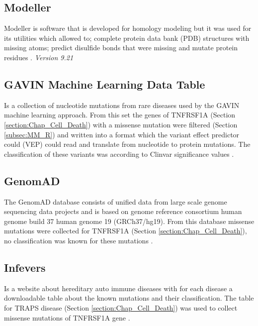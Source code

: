 \subsection{Modeller}
Modeller is software that is developed for homology modeling but it was used for its utilities which allowed to; complete protein data bank (PDB) structures with missing atoms; predict disulfide bonds that were missing and mutate protein residues \cite{}. 
\label{subsec:MM_Modeller}
\newline
\textit{Version 9.21}

\subsection{GAVIN Machine Learning Data Table}
Is a collection of nucleotide mutations from rare diseases used by the GAVIN \cite{} machine learning approach. From this set the genes of TNFRSF1A (Section \ref{section:Chap_Cell_Death}) with a missense mutation were filtered (Section \ref{subsec:MM_R}) and written into a format which the variant effect predictor could (VEP) \cite{} could read and translate from nucleotide to protein mutations. The classification of these variants was according to Clinvar significance values \cite{}. 
\label{subsec:MM_GAVIN_data_table}

\subsection{GenomAD}
The GenomAD database consists of unified data from large scale genome sequencing data projects and is based on genome reference consortium human genome build 37 human genome 19 (GRCh37/hg19). From this database missense mutations were collected for TNFRSF1A (Section \ref{section:Chap_Cell_Death}), no classification was known for these mutations \cite{}.
\label{subsec:MM_GenomAD}

\subsection{Infevers}
Is a website about hereditary auto immune diseases with for each disease a downloadable table about the known mutations and their classification. The table for TRAPS disease (Section \ref{section:Chap_Cell_Death}) was used to collect missense mutations of TNFRSF1A gene \cite{}.
\label{subsec:MM_Infevers}


